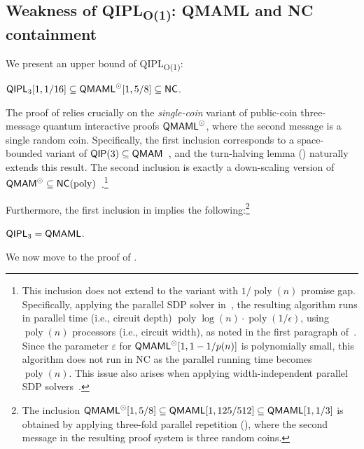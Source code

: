 \documentclass[10pt,a4paper]{article}
\numberwithin{equation}{section}
\numberwithin{figure}{section}
\newcommand{\QIP}{\textnormal{\textsf{QIP}}\xspace}
\newcommand{\QMAM}{\textnormal{\textsf{QMAM}}\xspace}
\newcommand{\QIPL}{\textnormal{\textsf{QIPL}}\xspace}
\newcommand{\QMAML}{\textnormal{\textsf{QMAML}}\xspace}
\newcommand{\QIPLconst}{\texorpdfstring{\textnormal{\textsf{QIPL}\textsubscript{O(1)}}}\xspace}
\newcommand{\NC}{\textnormal{\textsf{NC}}\xspace}
\DeclareMathOperator\poly{poly}
\begin{document}
\subsection{Weakness of \QIPLconst{}: \QMAML{} and \NC{} containment}
\label{subsec:NC-cointainment}

We present an upper bound of \QIPLconst{}: 

\begin{lemma}
    \label{lemma:QIPL3-in-NC}
    $\QIPL_3[1,1/16] \subseteq \QMAML^{\odot}[1,5/8] \subseteq \NC$. 
\end{lemma}

The proof of  relies crucially on the \textit{single-coin} variant of public-coin three-message quantum interactive proofs $\QMAML^{\odot}$, where the second message is a single random coin. 
Specifically, the first inclusion corresponds to a space-bounded variant of $\QIP(3) \subseteq \QMAM$~\cite[Section 5]{MW05}, and the turn-halving lemma () naturally extends this result. 
The second inclusion is exactly a down-scaling version of $\QMAM^{\odot} \subseteq \NC(\poly)$~\cite{JJUW11}.\footnote{This inclusion does not extend to the variant with $1/\poly(n)$ promise gap. Specifically, applying the parallel SDP solver in~\cite{JJUW11}, the resulting algorithm runs in parallel time (i.e., circuit depth) $\poly\log(n) \cdot \poly(1/\epsilon)$, using $\poly(n)$ processors (i.e., circuit width), as noted in the first paragraph of~\cite{JY11}. Since the parameter $\varepsilon$ for $\QMAML^{\odot}[1,1-1/p(n)]$ is polynomially small, this algorithm does not run in \NC{} as the parallel running time becomes $\poly(n)$. This issue also arises when applying width-independent parallel SDP solvers~\cite{JY11,AZLO16}.\label{footref:precision-in-parallel-SDP-solvers}}

Furthermore, the first inclusion in  implies the following:\footnote{The inclusion $\QMAML^{\odot}[1,5/8] \subseteq \QMAML[1,125/512] \subseteq \QMAML[1,1/3]$ is obtained by applying three-fold parallel repetition (), where the second message in the resulting proof system is three random coins. } 

\begin{corollary}
    \label{corr:QIPL3-eq-QMAML}
    $\QIPL_3 = \QMAML$. 
\end{corollary}

We now move to the proof of . 
\end{document}
